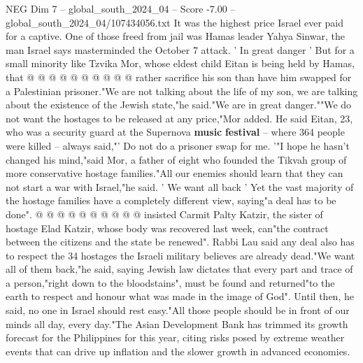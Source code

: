 \begin{textsample}{NEG Dim 7 – global\_south\_2024\_04 – Score -7.00 – global\_south\_2024\_04/107434056.txt}
It was the highest price Israel ever paid for a captive.
One of those freed from jail was Hamas leader Yahya Sinwar, the man Israel says masterminded the October 7 attack. ' In great danger ' But for a small minority like Tzvika Mor, whose eldest child Eitan is being held by Hamas, that @ @ @ @ @ @ @ @ @ @ rather sacrifice his son than have him swapped for a Palestinian prisoner."We are not talking about the life of my son, we are talking about the existence of the Jewish state,"he said."We are in great danger.""We do not want the hostages to be released at any price,"Mor added.
He said Eitan, 23, who was a security guard at the Supernova \textbf{music} \textbf{festival} -- where 364 people were killed -- always said,"' Do not do a prisoner swap for me. '"I hope he hasn't changed his mind,"said Mor, a father of eight who founded the Tikvah group of more conservative hostage families."All our enemies should learn that they can not start a war with Israel,"he said. ' We want all back ' Yet the vast majority of the hostage families have a completely different view, saying"a deal has to be done". @ @ @ @ @ @ @ @ @ @ insisted Carmit Palty Katzir, the sister of hostage Elad Katzir, whose body was recovered last week, can"the contract between the citizens and the state be renewed".
Rabbi Lau said any deal also has to respect the 34 hostages the Israeli military believes are already dead."We want all of them back,"he said, saying Jewish law dictates that every part and trace of a person,"right down to the bloodstains", must be found and returned"to the earth to respect and honour what was made in the image of God".
Until then, he said, no one in Israel should rest easy."All those people should be in front of our minds all day, every day."The Asian Development Bank has trimmed its growth forecast for the Philippines for this year, citing risks posed by extreme weather events that can drive up inflation and the slower growth in advanced economies.

\end{textsample}
